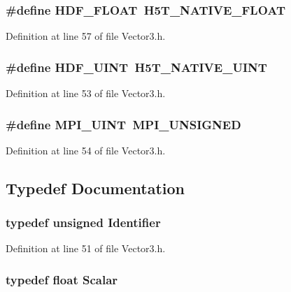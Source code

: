 \subsubsection[{HDF\_\-FLOAT}]{\setlength{\rightskip}{0pt plus 5cm}\#define HDF\_\-FLOAT~H5T\_\-NATIVE\_\-FLOAT}\label{Vector3_8h_a669eec24b7fa0bce364dc2d08724da7b}


Definition at line 57 of file Vector3.h.

\subsubsection[{HDF\_\-UINT}]{\setlength{\rightskip}{0pt plus 5cm}\#define HDF\_\-UINT~H5T\_\-NATIVE\_\-UINT}\label{Vector3_8h_ac366362734c04742f3c0777e399648af}


Definition at line 53 of file Vector3.h.

\subsubsection[{MPI\_\-UINT}]{\setlength{\rightskip}{0pt plus 5cm}\#define MPI\_\-UINT~MPI\_\-UNSIGNED}\label{Vector3_8h_a36f55c7359c730c7b6be07a113c6af7b}


Definition at line 54 of file Vector3.h.



\subsection{Typedef Documentation}
\subsubsection[{Identifier}]{\setlength{\rightskip}{0pt plus 5cm}typedef unsigned {\bf Identifier}}\label{Vector3_8h_a25e0b8ddd193bb84ebf6c0eeff6b1c82}


Definition at line 51 of file Vector3.h.

\subsubsection[{Scalar}]{\setlength{\rightskip}{0pt plus 5cm}typedef float {\bf Scalar}}\label{Vector3_8h_aacf5954d048aaaaef04620896706921d}


